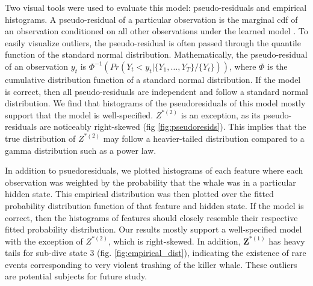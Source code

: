 Two visual tools were used to evaluate this model: pseudo-residuals and empirical histograms. A pseudo-residual of a particular observation is the marginal cdf of an observation conditioned on all other observations under the learned model \citep{Zucchini:2016}. To easily visualize outliers, the pseudo-residual is often passed through the quantile function of the standard normal distribution. Mathematically, the pseudo-residual of an observation $y_t$ is $\Phi^{-1} \left(Pr(Y_t < y_t|\{Y_1,\ldots,Y_T\}/\{Y_t\}) \right)$, where $\Phi$ is the cumulative distribution function of a standard normal distribution. If the model is correct, then all pseudo-residuals are independent and follow a standard normal distribution. We find that histograms of the pseudoresiduals of this model mostly support that the model is well-specified. $Z^{*(2)}$ is an exception, as its pseudo-residuals are noticeably right-skewed (fig \ref{fig:pseudoresids}). This implies that the true distribution of $Z^{*(2)}$ may follow a heavier-tailed distribution compared to a gamma distribution such as a power law. 

In addition to psuedoresiduals, we plotted histograms of each feature where each observation was weighted by the probability that the whale was in a particular hidden state. This empirical distribution was then plotted over the fitted probability distribution function of that feature and hidden state. If the model is correct, then the histograms of features should closely resemble their respective fitted probability distribution. Our results mostly support a well-specified model with the exception of $Z^{*(2)}$, which is right-skewed. In addition, $\mathbf{Z}^{*(1)}$ has heavy tails for sub-dive state 3 (fig. \ref{fig:empirical_dist}), indicating the existence of rare events corresponding to very violent trashing of the killer whale. These outliers are potential subjects for future study.